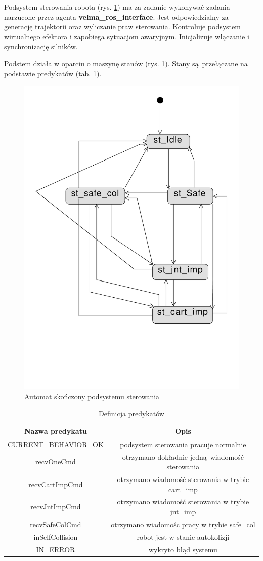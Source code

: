 \documentclass[]{article}
\begin{document}
Podsystem sterowania robota (rys. \ref{fig:fsm}) ma za zadanie wykonywać zadania narzucone przez agenta \textbf{velma\_ros\_interface}. Jest odpowiedzialny za generację trajektorii oraz wyliczanie praw sterowania. Kontroluje podsystem wirtualnego efektora i zapobiega sytuacjom awaryjnym. Inicjalizuje włączanie i synchronizację silników.

Podstem działa w oparciu o maszynę stanów (rys. \ref{fig:fsm}). Stany są przełączane na podstawie predykatów (tab. \ref{tab:pred}).

	\begin{figure}[H]
		\centering
		\includegraphics[width=0.4\linewidth]{fsm_cs}
		\caption{Automat skończony podsystemu sterowania}
		\label{fig:fsm}
	\end{figure}

	\begin{table}[H]
		\begin{tabular}{||c|c||}
		\hline
		Nazwa predykatu & Opis \\
		\hline \hline
		CURRENT\_BEHAVIOR\_OK & podsystem sterowania pracuje normalnie \\
		recvOneCmd & otrzymano dokładnie jedną wiadomość sterowania \\
		recvCartImpCmd & otrzymano wiadomość sterowania w trybie cart\_imp \\
		recvJntImpCmd & otrzymano wiadomość sterowania w trybie jnt\_imp \\
		recvSafeColCmd & otrzymano wiadomośc pracy w trybie safe\_col \\
		inSelfCollision & robot jest w stanie autokolizji \\
		IN\_ERROR & wykryto błąd systemu \\
		\hline
		\end{tabular}
		\label{tab:pred}
		\caption{Definicja predykatów}
	\end{table}
\end{document}
